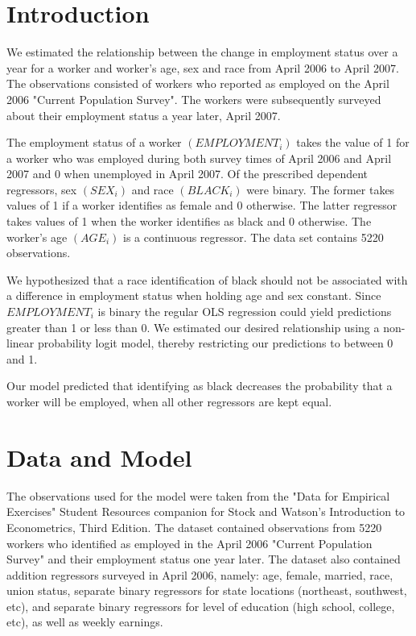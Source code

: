 \documentclass[12pt]{article}
\begin{document}



\doublespacing
\section{Introduction}
\label{sec:1}

We estimated the relationship between the change in employment status over a year for a worker and worker's age, sex and race from April 2006 to April 2007. The observations consisted of workers who reported as employed on the April 2006 "Current Population Survey". The workers were subsequently surveyed about their employment status a year later, April 2007.

The employment status of a worker $(EMPLOYMENT_i)$ takes the value of 1 for a worker who was employed during both survey times of April 2006 and April 2007 and 0 when unemployed in April 2007. Of the prescribed dependent regressors, sex $(SEX_i)$ and race $(BLACK_i)$ were binary. The former takes values of 1 if a worker identifies as female and 0 otherwise. The latter regressor takes values of 1 when the worker identifies as black and 0 otherwise. The worker's age $(AGE_i)$ is a continuous regressor. The data set contains 5220 observations.

We hypothesized that a race identification of black should not be associated with a difference in employment status when holding age and sex constant. Since $EMPLOYMENT_i$ is binary the regular OLS regression could yield predictions greater than 1 or less than 0. We estimated our desired relationship using a non-linear probability logit model, thereby restricting our predictions to between 0 and 1.  

Our model predicted that identifying as black decreases the probability that a worker will be employed, when all other regressors are kept equal.

\section{Data and Model}
\label{sec:2}

The observations used for the model were taken from the "Data for Empirical Exercises" Student Resources companion for Stock and Watson's Introduction to Econometrics, Third Edition. The dataset contained observations from 5220 workers who identified as employed in the April 2006 "Current Population Survey" and their employment status one year later. The dataset also contained addition regressors surveyed in April 2006, namely: age, female, married, race, union status, separate binary regressors for state locations (northeast, southwest, etc), and separate binary regressors for level of education (high school, college, etc), as well as weekly earnings. 
\end{document}
